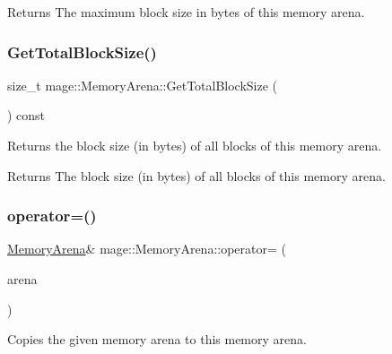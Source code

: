 \begin{DoxyReturn}{Returns}
The maximum block size in bytes of this memory arena. 
\end{DoxyReturn}
\mbox{\label{classmage_1_1_memory_arena_ac8e8ac4ba60cd2bb1d8dc8a5d4a9f4ad}} 
\subsubsection{\texorpdfstring{Get\+Total\+Block\+Size()}{GetTotalBlockSize()}}
{\footnotesize\ttfamily size\+\_\+t mage\+::\+Memory\+Arena\+::\+Get\+Total\+Block\+Size (\begin{DoxyParamCaption}{ }\end{DoxyParamCaption}) const\hspace{0.3cm}{\ttfamily [noexcept]}}

Returns the block size (in bytes) of all blocks of this memory arena.

\begin{DoxyReturn}{Returns}
The block size (in bytes) of all blocks of this memory arena. 
\end{DoxyReturn}
\mbox{\label{classmage_1_1_memory_arena_a7e7799f859c55435714933972ecb8b95}} 
\subsubsection{\texorpdfstring{operator=()}{operator=()}\hspace{0.1cm}{\footnotesize\ttfamily [1/2]}}
{\footnotesize\ttfamily \mbox{\hyperlink{classmage_1_1_memory_arena}{Memory\+Arena}}\& mage\+::\+Memory\+Arena\+::operator= (\begin{DoxyParamCaption}\item[{const \mbox{\hyperlink{classmage_1_1_memory_arena}{Memory\+Arena}} \&}]{arena }\end{DoxyParamCaption})\hspace{0.3cm}{\ttfamily [delete]}}

Copies the given memory arena to this memory arena.


